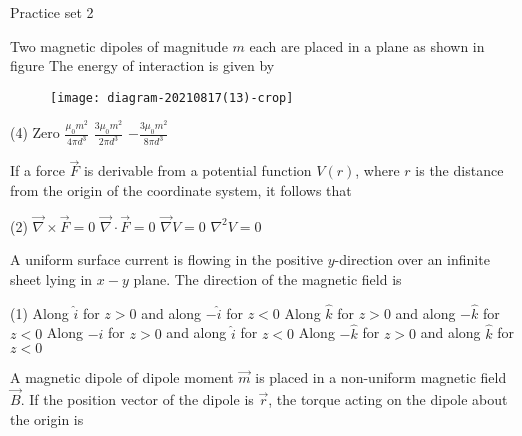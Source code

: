 \newpage
\begin{abox}
	Practice set 2
\end{abox}
\begin{enumerate}
\begin{minipage}{\textwidth}
	\item Two magnetic dipoles of magnitude $m$ each are placed in a plane as shown in figure The energy of interaction is given by
	\begin{figure}[H]
		\centering
		\texttt{[image: diagram-20210817(13)-crop]}
		\caption{}
		\label{}
	\end{figure}
\end{minipage}
\begin{tasks}(4)
	\task[\textbf{A.}] Zero
	\task[\textbf{B.}]$\frac{\mu_{0} m^{2}}{4 \pi d^{3}}$
	\task[\textbf{C.}]$\frac{3 \mu_{0} m^{2}}{2 \pi d^{3}}$
	\task[\textbf{D.}]$-\frac{3 \mu_{0} m^{2}}{8 \pi d^{3}}$
\end{tasks}
\begin{minipage}{\textwidth}
	\item If a force $\vec{F}$ is derivable from a potential function $V(r)$, where $r$ is the distance from the origin of the coordinate system, it follows that
\end{minipage}
\begin{tasks}(2)
	\task[\textbf{A.}]$\vec{\nabla} \times \vec{F}=0$
	\task[\textbf{B.}]$\vec{\nabla} \cdot \vec{F}=0$
	\task[\textbf{C.}]$\vec{\nabla} V=0$
	\task[\textbf{D.}]$\nabla^{2} V=0$
\end{tasks}
\begin{minipage}{\textwidth}
	\item A uniform surface current is flowing in the positive $y$-direction over an infinite sheet lying in $x-y$ plane. The direction of the magnetic field is
\end{minipage}
\begin{tasks}(1)
	\task[\textbf{A.}]Along $\hat{i}$ for $z>0$ and along $-\hat{i}$ for $z<0$
	\task[\textbf{B.}]Along $\hat{k}$ for $z>0$ and along $-\hat{k}$ for $z<0$
	\task[\textbf{C.}]Along $-\hat{i}$ for $z>0$ and along $\hat{i}$ for $z<0$
	\task[\textbf{D.}]Along $-\hat{k}$ for $z>0$ and along $\hat{k}$ for $z<0$
\end{tasks}
\begin{minipage}{\textwidth}
	\item A magnetic dipole of dipole moment $\vec{m}$ is placed in a non-uniform magnetic field $\vec{B} .$ If the position vector of the dipole is $\vec{r}$, the torque acting on the dipole about the origin is

\end{minipage}
\end{enumerate}

